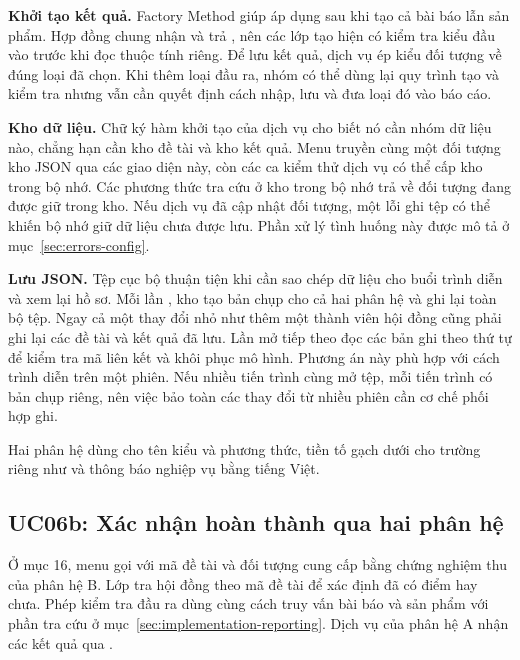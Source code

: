 \textbf{Khởi tạo kết quả.} Factory Method giúp áp dụng  sau khi tạo cả bài báo lẫn sản phẩm. Hợp đồng chung nhận  và trả , nên các lớp tạo hiện có kiểm tra kiểu đầu vào trước khi đọc thuộc tính riêng. Để lưu kết quả, dịch vụ ép kiểu đối tượng về đúng loại đã chọn. Khi thêm loại đầu ra, nhóm có thể dùng lại quy trình tạo và kiểm tra nhưng vẫn cần quyết định cách nhập, lưu và đưa loại đó vào báo cáo.

\textbf{Kho dữ liệu.} Chữ ký hàm khởi tạo của dịch vụ cho biết nó cần nhóm dữ liệu nào, chẳng hạn  cần kho đề tài và kho kết quả. Menu truyền cùng một đối tượng kho JSON qua các giao diện này, còn các ca kiểm thử dịch vụ có thể cấp kho trong bộ nhớ. Các phương thức tra cứu ở kho trong bộ nhớ trả về đối tượng đang được giữ trong kho. Nếu dịch vụ đã cập nhật đối tượng, một lỗi ghi tệp có thể khiến bộ nhớ giữ dữ liệu chưa được lưu. Phần xử lý tình huống này được mô tả ở mục~\ref{sec:errors-config}.

\textbf{Lưu JSON.} Tệp cục bộ thuận tiện khi cần sao chép dữ liệu cho buổi trình diễn và xem lại hồ sơ. Mỗi lần , kho tạo bản chụp cho cả hai phân hệ và ghi lại toàn bộ tệp. Ngay cả một thay đổi nhỏ như thêm một thành viên hội đồng cũng phải ghi lại các đề tài và kết quả đã lưu. Lần mở tiếp theo đọc các bản ghi theo thứ tự để kiểm tra mã liên kết và khôi phục mô hình. Phương án này phù hợp với cách trình diễn trên một phiên. Nếu nhiều tiến trình cùng mở tệp, mỗi tiến trình có bản chụp riêng, nên việc bảo toàn các thay đổi từ nhiều phiên cần cơ chế phối hợp ghi.

Hai phân hệ dùng  cho tên kiểu và phương thức, tiền tố gạch dưới cho trường riêng như  và thông báo nghiệp vụ bằng tiếng Việt.

\label{sec:implementation}
\subsection{UC06b: Xác nhận hoàn thành qua hai phân hệ}\label{sec:implementation-integration}

Ở mục 16, menu gọi  với mã đề tài và đối tượng cung cấp bằng chứng nghiệm thu của phân hệ B. Lớp  tra hội đồng theo mã đề tài để xác định đã có điểm hay chưa. Phép kiểm tra đầu ra dùng cùng cách truy vấn bài báo và sản phẩm với phần tra cứu ở mục~\ref{sec:implementation-reporting}. Dịch vụ của phân hệ A nhận các kết quả qua .

